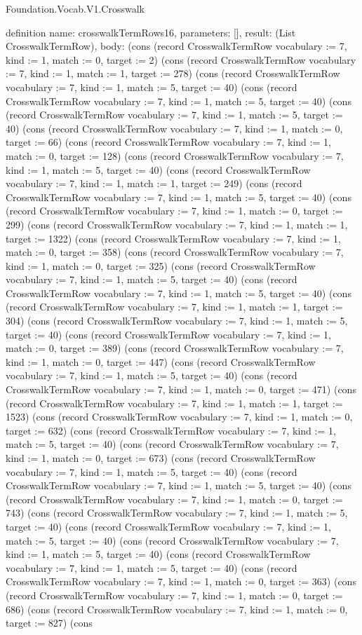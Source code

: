 \begin{lexlean}{Foundation.Vocab.V1.Crosswalk}
\begin{semanticmodule}
definition{
  name: crosswalkTermRows16,
  parameters: [],
  result: (List CrosswalkTermRow),
  body: (cons (record CrosswalkTermRow {vocabulary := 7, kind := 1, match := 0, target := 2}) (cons (record CrosswalkTermRow {vocabulary := 7, kind := 1, match := 1, target := 278}) (cons (record CrosswalkTermRow {vocabulary := 7, kind := 1, match := 5, target := 40}) (cons (record CrosswalkTermRow {vocabulary := 7, kind := 1, match := 5, target := 40}) (cons (record CrosswalkTermRow {vocabulary := 7, kind := 1, match := 5, target := 40}) (cons (record CrosswalkTermRow {vocabulary := 7, kind := 1, match := 0, target := 66}) (cons (record CrosswalkTermRow {vocabulary := 7, kind := 1, match := 0, target := 128}) (cons (record CrosswalkTermRow {vocabulary := 7, kind := 1, match := 5, target := 40}) (cons (record CrosswalkTermRow {vocabulary := 7, kind := 1, match := 1, target := 249}) (cons (record CrosswalkTermRow {vocabulary := 7, kind := 1, match := 5, target := 40}) (cons (record CrosswalkTermRow {vocabulary := 7, kind := 1, match := 0, target := 299}) (cons (record CrosswalkTermRow {vocabulary := 7, kind := 1, match := 1, target := 1322}) (cons (record CrosswalkTermRow {vocabulary := 7, kind := 1, match := 0, target := 358}) (cons (record CrosswalkTermRow {vocabulary := 7, kind := 1, match := 0, target := 325}) (cons (record CrosswalkTermRow {vocabulary := 7, kind := 1, match := 5, target := 40}) (cons (record CrosswalkTermRow {vocabulary := 7, kind := 1, match := 5, target := 40}) (cons (record CrosswalkTermRow {vocabulary := 7, kind := 1, match := 1, target := 304}) (cons (record CrosswalkTermRow {vocabulary := 7, kind := 1, match := 5, target := 40}) (cons (record CrosswalkTermRow {vocabulary := 7, kind := 1, match := 0, target := 389}) (cons (record CrosswalkTermRow {vocabulary := 7, kind := 1, match := 0, target := 447}) (cons (record CrosswalkTermRow {vocabulary := 7, kind := 1, match := 5, target := 40}) (cons (record CrosswalkTermRow {vocabulary := 7, kind := 1, match := 0, target := 471}) (cons (record CrosswalkTermRow {vocabulary := 7, kind := 1, match := 1, target := 1523}) (cons (record CrosswalkTermRow {vocabulary := 7, kind := 1, match := 0, target := 632}) (cons (record CrosswalkTermRow {vocabulary := 7, kind := 1, match := 5, target := 40}) (cons (record CrosswalkTermRow {vocabulary := 7, kind := 1, match := 0, target := 673}) (cons (record CrosswalkTermRow {vocabulary := 7, kind := 1, match := 5, target := 40}) (cons (record CrosswalkTermRow {vocabulary := 7, kind := 1, match := 5, target := 40}) (cons (record CrosswalkTermRow {vocabulary := 7, kind := 1, match := 0, target := 743}) (cons (record CrosswalkTermRow {vocabulary := 7, kind := 1, match := 5, target := 40}) (cons (record CrosswalkTermRow {vocabulary := 7, kind := 1, match := 5, target := 40}) (cons (record CrosswalkTermRow {vocabulary := 7, kind := 1, match := 5, target := 40}) (cons (record CrosswalkTermRow {vocabulary := 7, kind := 1, match := 5, target := 40}) (cons (record CrosswalkTermRow {vocabulary := 7, kind := 1, match := 0, target := 363}) (cons (record CrosswalkTermRow {vocabulary := 7, kind := 1, match := 0, target := 686}) (cons (record CrosswalkTermRow {vocabulary := 7, kind := 1, match := 0, target := 827}) (cons }
\end{semanticmodule}
\end{lexlean}
